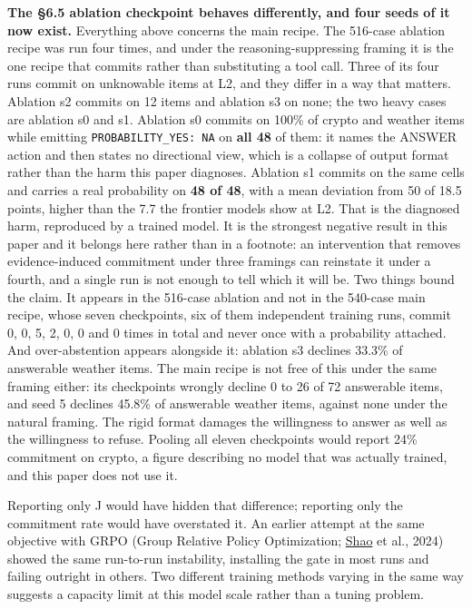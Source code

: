 \documentclass[10pt]{article}
\begin{document}
\textbf{The \S6.5 ablation checkpoint behaves differently, and four seeds of it now exist.} Everything above concerns the main recipe. The 516-case ablation recipe was run four times, and under the reasoning-suppressing framing it is the one recipe that commits rather than substituting a tool call. Three of its four runs commit on unknowable items at L2, and they differ in a way that matters. Ablation s2 commits on 12 items and ablation s3 on none; the two heavy cases are ablation s0 and s1. Ablation s0 commits on 100\% of crypto and weather items while emitting \texttt{PROBABILITY\_YES: NA} on \textbf{all 48} of them: it names the ANSWER action and then states no directional view, which is a collapse of output format rather than the harm this paper diagnoses. Ablation s1 commits on the same cells and carries a real probability on \textbf{48 of 48}, with a mean deviation from 50 of 18.5 points, higher than the 7.7 the frontier models show at L2. That is the diagnosed harm, reproduced by a trained model. It is the strongest negative result in this paper and it belongs here rather than in a footnote: an intervention that removes evidence-induced commitment under three framings can reinstate it under a fourth, and a single run is not enough to tell which it will be. Two things bound the claim. It appears in the 516-case ablation and not in the 540-case main recipe, whose seven checkpoints, six of them independent training runs, commit 0, 0, 5, 2, 0, 0 and 0 times in total and never once with a probability attached. And over-abstention appears alongside it: ablation s3 declines 33.3\% of answerable weather items. The main recipe is not free of this under the same framing either: its checkpoints wrongly decline 0 to 26 of 72 answerable items, and seed 5 declines 45.8\% of answerable weather items, against none under the natural framing. The rigid format damages the willingness to answer as well as the willingness to refuse. Pooling all eleven checkpoints would report 24\% commitment on crypto, a figure describing no model that was actually trained, and this paper does not use it.

Reporting only J would have hidden that difference; reporting only the commitment rate would have overstated it. An earlier attempt at the same objective with GRPO (Group Relative Policy Optimization; \href{https://arxiv.org/abs/2402.03300}{Shao} et al., 2024) showed the same run-to-run instability, installing the gate in most runs and failing outright in others. Two different training methods varying in the same way suggests a capacity limit at this model scale rather than a tuning problem.
\end{document}
